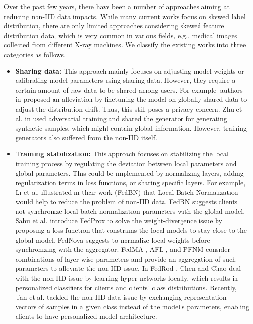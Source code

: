 \documentclass[journal]{IEEEtai}
\begin{document}
Over the past few years, there have been a number of approaches aiming at reducing non-IID data impacts. While many current works focus on skewed label distribution, there are only limited approaches considering skewed feature distribution data, which is very common in various fields, e.g., medical images collected from different X-ray machines. We classify the existing works into three categories as follows.

\begin{itemize}
\item \textbf{Sharing data:}
This approach mainly focuses on adjusting model weights or calibrating model parameters using sharing data. However, they require a certain amount of raw data to be shared among users. For example, authors in \cite{Zhao2018FederatedLW, nofearofheterogeneity} proposed an alleviation by finetuning the model on globally shared data to adjust the distribution drift. Thus, this still poses a privacy concern. Zhu et al. in \cite{distillationFL} used adversarial training and shared the generator for generating synthetic samples, which might contain global information. However, training generators also suffered from the non-IID itself.       

\item \textbf{Training stabilization:}
This approach focuses on stabilizing the local training process by regulating the deviation between local parameters and global parameters. This could be implemented by normalizing layers, adding regularization terms in loss functions, or sharing specific layers. For example, Li et al. illustrated in their work (FedBN) \cite{li2021fedbn} that Local Batch Normalization would help to reduce the problem of non-IID data. FedBN suggests clients not synchronize local batch normalization parameters with the global model. Sahu et al. introduce FedProx \cite{FedProx} to solve the weight-divergence issue by proposing a loss function that constrains the local models to stay close to the global model. FedNova \cite{fednova} suggests to normalize local weights before synchronizing with the aggregator. FedMA \cite{fedma}, AFL \cite{AFL}, and PFNM \cite{pfnm} consider combinations of layer-wise parameters and provide an aggregation of such parameters to alleviate the non-IID issue. In FedRod \cite{FedRod}, Chen and Chao deal with the non-IID issue by learning hyper-networks locally, which results in personalized classifiers for clients and clients' class distributions. Recently, Tan et al. \cite{fedpcl} tackled the non-IID data issue by exchanging representation vectors of samples in a given class instead of the model's parameters, enabling clients to have personalized model architecture.    
 

\end{itemize}
\end{document}
